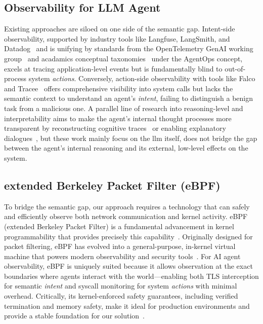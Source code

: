 \subsection{Observability for LLM Agent}

Existing approaches are siloed on one side of the semantic gap. Intent-side observability, supported by industry tools like Langfuse, LangSmith, and Datadog~\cite{Maierhofer2025Langfuse, langfuse, langsmith, Datadog2023Agents, helicone} and is unifying by standards from the OpenTelemetry GenAI working group~\cite{Liu2025OTel,Bandurchin2025Uptrace} and acadamics conceptual taxonomies~\cite{Dong2024AgentOps, Moshkovich2025Pipeline} under the AgentOps concept, excels at tracing application-level events but is fundamentally blind to out-of-process system \emph{actions}. Conversely, action-side observability with tools like Falco and Tracee~\cite{falco, tracee} offers comprehensive visibility into system calls but lacks the semantic context to understand an agent's \emph{intent}, failing to distinguish a benign task from a malicious one. A parallel line of research into reasoning-level and interpretability aims to make the agent's internal thought processes more transparent by reconstructing cognitive traces~\cite{Rombaut2025Watson} or enabling explanatory dialogues~\cite{Kim2025AgenticInterp}, but these work mainly focus on the llm itself, does not bridge the gap between the agent's internal reasoning and its external, low-level effects on the system.

\subsection{extended Berkeley Packet Filter (eBPF)}

To bridge the semantic gap, our approach requires a technology that can safely and efficiently observe both network communication and kernel activity. eBPF (extended Berkeley Packet Filter) is a fundamental advancement in kernel programmability that provides precisely this capability~\cite{brendangregg}. Originally designed for packet filtering, eBPF has evolved into a general-purpose, in-kernel virtual machine that powers modern observability and security tools~\cite{ebpfio,cilium}. For AI agent observability, eBPF is uniquely suited because it allows observation at the exact boundaries where agents interact with the world—enabling both TLS interception for semantic \emph{intent} and syscall monitoring for system \emph{actions} with minimal overhead. Critically, its kernel-enforced safety guarantees, including verified termination and memory safety, make it ideal for production environments and provide a stable foundation for our solution~\cite{kerneldoc}.


